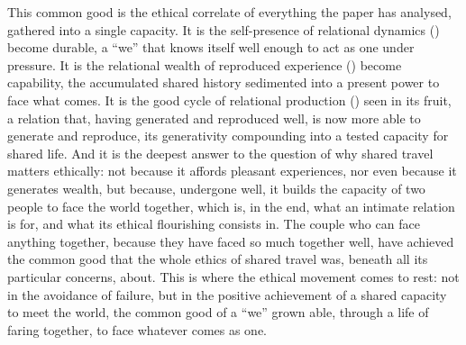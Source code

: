 This common good is the ethical correlate of everything the paper has analysed, gathered into a single capacity. It is the self-presence of relational dynamics () become durable, a ``we'' that knows itself well enough to act as one under pressure. It is the relational wealth of reproduced experience () become capability, the accumulated shared history sedimented into a present power to face what comes. It is the good cycle of relational production () seen in its fruit, a relation that, having generated and reproduced well, is now more able to generate and reproduce, its generativity compounding into a tested capacity for shared life. And it is the deepest answer to the question of why shared travel matters ethically: not because it affords pleasant experiences, nor even because it generates wealth, but because, undergone well, it builds the capacity of two people to face the world together, which is, in the end, what an intimate relation is for, and what its ethical flourishing consists in. The couple who can face anything together, because they have faced so much together well, have achieved the common good that the whole ethics of shared travel was, beneath all its particular concerns, about. This is where the ethical movement comes to rest: not in the avoidance of failure, but in the positive achievement of a shared capacity to meet the world, the common good of a ``we'' grown able, through a life of faring together, to face whatever comes as one.
